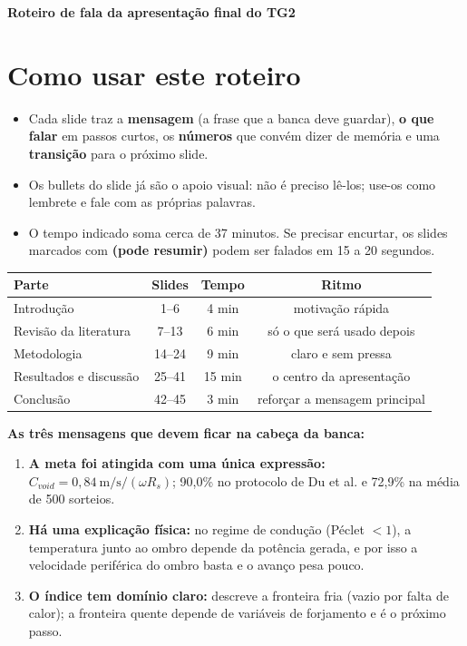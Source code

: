 \documentclass[11pt,a4paper]{article}
\begin{document}
\begin{center}
{\Large\bfseries\color{azulita} Roteiro de fala da apresentação final do TG2\par}
\end{center}

\section*{Como usar este roteiro}
\begin{itemize}
  \item Cada slide traz a \textbf{mensagem} (a frase que a banca deve guardar), \textbf{o que falar} em passos curtos, os \textbf{números} que convém dizer de memória e uma \textbf{transição} para o próximo slide.
  \item Os bullets do slide já são o apoio visual: não é preciso lê-los; use-os como lembrete e fale com as próprias palavras.
  \item O tempo indicado soma cerca de 37 minutos. Se precisar encurtar, os slides marcados com \textbf{(pode resumir)} podem ser falados em 15 a 20 segundos.
\end{itemize}

\begin{center}\small
\begin{tabular}{lccc}
\toprule
\textbf{Parte} & \textbf{Slides} & \textbf{Tempo} & \textbf{Ritmo} \\ \midrule
Introdução & 1--6 & 4 min & motivação rápida \\
Revisão da literatura & 7--13 & 6 min & só o que será usado depois \\
Metodologia & 14--24 & 9 min & claro e sem pressa \\
Resultados e discussão & 25--41 & 15 min & o centro da apresentação \\
Conclusão & 42--45 & 3 min & reforçar a mensagem principal \\ \bottomrule
\end{tabular}
\end{center}

\textbf{As três mensagens que devem ficar na cabeça da banca:}
\begin{enumerate}
  \item \textbf{A meta foi atingida com uma única expressão:} $C_{void} = 0{,}84~\text{m/s}/(\omega R_s)$; 90,0\% no protocolo de Du et al. e 72,9\% na média de 500 sorteios.
  \item \textbf{Há uma explicação física:} no regime de condução (Péclet $<1$), a temperatura junto ao ombro depende da potência gerada, e por isso a velocidade periférica do ombro basta e o avanço pesa pouco.
  \item \textbf{O índice tem domínio claro:} descreve a fronteira fria (vazio por falta de calor); a fronteira quente depende de variáveis de forjamento e é o próximo passo.
\end{enumerate}
\end{document}
